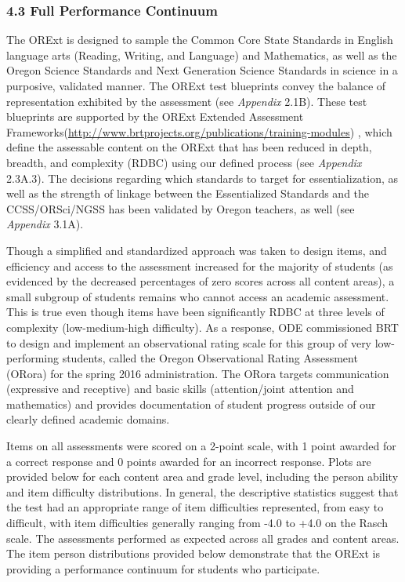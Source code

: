 \documentclass[]{article}
\begin{document}
\subsubsection{4.3 Full Performance
Continuum}\label{full-performance-continuum}

The ORExt is designed to sample the Common Core State Standards in
English language arts (Reading, Writing, and Language) and Mathematics,
as well as the Oregon Science Standards and Next Generation Science
Standards in science in a purposive, validated manner. The ORExt test
blueprints convey the balance of representation exhibited by the
assessment (see \emph{Appendix} 2.1B). These test blueprints are
supported by the \color{link}{[}ORExt Extended Assessment
Frameworks(\url{http://www.brtprojects.org/publications/training-modules})
\color{black}, which define the assessable content on the ORExt that has
been reduced in depth, breadth, and complexity (RDBC) using our defined
process (see \emph{Appendix} 2.3A.3). The decisions regarding which
standards to target for essentialization, as well as the strength of
linkage between the Essentialized Standards and the CCSS/ORSci/NGSS has
been validated by Oregon teachers, as well (see \emph{Appendix} 3.1A).

Though a simplified and standardized approach was taken to design items,
and efficiency and access to the assessment increased for the majority
of students (as evidenced by the decreased percentages of zero scores
across all content areas), a small subgroup of students remains who
cannot access an academic assessment. This is true even though items
have been significantly RDBC at three levels of complexity
(low-medium-high difficulty). As a response, ODE commissioned BRT to
design and implement an observational rating scale for this group of
very low-performing students, called the Oregon Observational Rating
Assessment (ORora) for the spring 2016 administration. The ORora targets
communication (expressive and receptive) and basic skills
(attention/joint attention and mathematics) and provides documentation
of student progress outside of our clearly defined academic domains.

Items on all assessments were scored on a 2-point scale, with 1 point
awarded for a correct response and 0 points awarded for an incorrect
response. Plots are provided below for each content area and grade
level, including the person ability and item difficulty distributions.
In general, the descriptive statistics suggest that the test had an
appropriate range of item difficulties represented, from easy to
difficult, with item difficulties generally ranging from -4.0 to +4.0 on
the Rasch scale. The assessments performed as expected across all grades
and content areas. The item person distributions provided below
demonstrate that the ORExt is providing a performance continuum for
students who participate.
\end{document}
